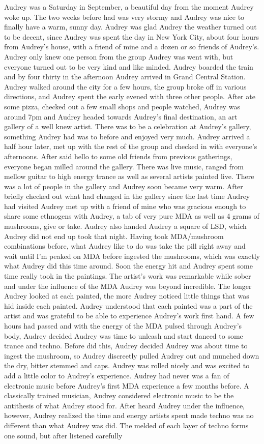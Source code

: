 \documentclass[12pt]{book}
\begin{document}
Audrey was a Saturday in September, a beautiful day from the moment Audrey woke up. The two weeks before had was very stormy and Audrey was nice to finally have a warm, sunny day. Audrey was glad Audrey the weather turned out to be decent, since Audrey was spent the day in New York City, about four hours from Audrey's house, with a friend of mine and a dozen or so friends of Audrey's. Audrey only knew one person from the group Audrey was went with, but everyone turned out to be very kind and like minded. Audrey boarded the train and by four thirty in the afternoon Audrey arrived in Grand Central Station. Audrey walked around the city for a few hours, the group broke off in various directions, and Audrey spent the early evened with three other people. After ate some pizza, checked out a few small shops and people watched, Audrey was around 7pm and Audrey headed towards Audrey's final destination, an art gallery of a well knew artist. There was to be a celebration at Audrey's gallery, something Audrey had was to before and enjoyed very much. Audrey arrived a half hour later, met up with the rest of the group and checked in with everyone's afternoons. After said hello to some old friends from previous gatherings, everyone began milled around the gallery. There was live music, ranged from mellow guitar to high energy trance as well as several artists painted live. There was a lot of people in the gallery and Audrey soon became very warm. After briefly checked out what had changed in the gallery since the last time Audrey had visited Audrey met up with a friend of mine who was gracious enough to share some ethnogens with Audrey, a tab of very pure MDA as well as 4 grams of mushrooms, give or take. Audrey also handed Audrey a square of LSD, which Audrey did not end up took that night. Having took MDA/mushroom combinations before, what Audrey like to do was take the pill right away and wait until I'm peaked on MDA before ingested the mushrooms, which was exactly what Audrey did this time around. Soon the energy hit and Audrey spent some time really took in the paintings. The artist's work was remarkable while sober and under the influence of the MDA Audrey was beyond incredible. The longer Audrey looked at each painted, the more Audrey noticed little things that was hid inside each painted. Audrey understood that each painted was a part of the artist and was grateful to be able to experience Audrey's work first hand. A few hours had passed and with the energy of the MDA pulsed through Audrey's body, Audrey decided Audrey was time to unleash and start danced to some trance and techno. Before did this, Audrey decided Audrey was about time to ingest the mushroom, so Audrey discreetly pulled Audrey out and munched down the dry, bitter stemmed and caps. Audrey was rolled nicely and was excited to add a little color to Audrey's experience. Audrey had never was a fan of electronic music before Audrey's first MDA experience a few months before. A classically trained musician, Audrey considered electronic music to be the antithesis of what Audrey stood for. After heard Audrey under the influence, however, Audrey realized the time and energy artists spent made techno was no different than what Audrey was did. The melded of each layer of techno forms one sound, but after listened carefully 
\end{document}
